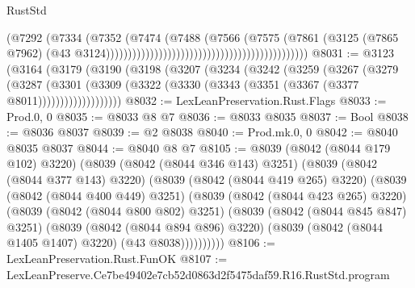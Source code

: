 \begin{lexlean}{RustStd}
\begin{coremodule}
                                                                            (@7292
                                                                              (@7334
                                                                                (@7352
                                                                                  (@7474
                                                                                    (@7488
                                                                                      (@7566
                                                                                        (@7575
                                                                                          (@7861
                                                                                            (@3125
                                                                                              (@7865
                                                                                                @7962)
                                                                                              (@43
                                                                                                @3124))))))))))))))))))))))))))))))))))))))))))))))
@8031 := @3123
    (@3164
      (@3179
        (@3190
          (@3198
            (@3207
              (@3234
                (@3242
                  (@3259
                    (@3267
                      (@3279
                        (@3287
                          (@3301
                            (@3309
                              (@3322 (@3330 (@3343 (@3351 (@3367 (@3377 @8011)))))))))))))))))))
@8032 := LexLeanPreservation.Rust.Flags
@8033 := Prod.{0, 0}
@8035 := @8033 @8 @7
@8036 := @8033 @8035
@8037 := Bool
@8038 := @8036 @8037
@8039 := @2 @8038
@8040 := Prod.mk.{0, 0}
@8042 := @8040 @8035 @8037
@8044 := @8040 @8 @7
@8105 := @8039
    (@8042 (@8044 @179 @102) @3220)
    (@8039
      (@8042 (@8044 @346 @143) @3251)
      (@8039
        (@8042 (@8044 @377 @143) @3220)
        (@8039
          (@8042 (@8044 @419 @265) @3220)
          (@8039
            (@8042 (@8044 @400 @449) @3251)
            (@8039
              (@8042 (@8044 @423 @265) @3220)
              (@8039
                (@8042 (@8044 @800 @802) @3251)
                (@8039
                  (@8042 (@8044 @845 @847) @3251)
                  (@8039
                    (@8042 (@8044 @894 @896) @3220)
                    (@8039 (@8042 (@8044 @1405 @1407) @3220) (@43 @8038))))))))))
@8106 := LexLeanPreservation.Rust.FunOK
@8107 := LexLeanPreserve.Ce7be49402e7cb52d0863d2f5475daf59.R16.RustStd.program

\end{coremodule}
\end{lexlean}

